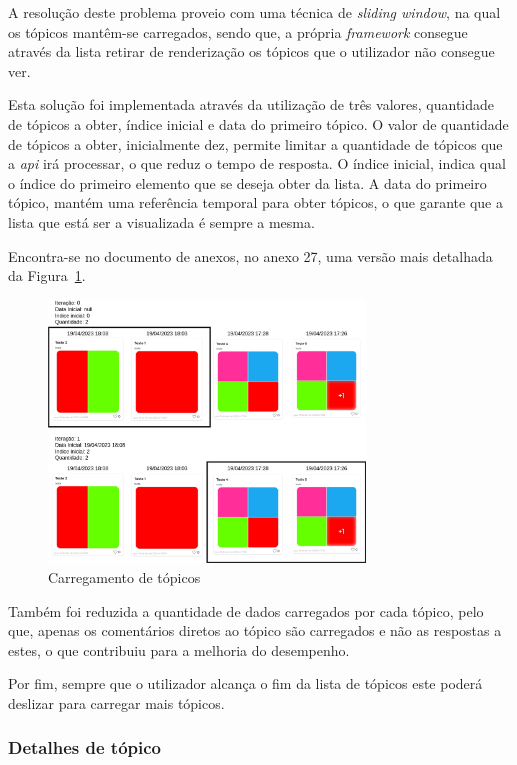 A resolução deste problema proveio com uma técnica de \textit{sliding window}, na qual os tópicos mantêm-se carregados, sendo que, a própria \textit{framework} consegue através da lista retirar de renderização os tópicos que o utilizador não consegue ver. 

Esta solução foi implementada através da utilização de três valores, quantidade de tópicos a obter, índice inicial e data do primeiro tópico. O valor de quantidade de tópicos a obter, inicialmente dez, permite limitar a quantidade de tópicos que a \textit{\acrshort{api}} irá processar, o que reduz o tempo de resposta. O índice inicial, indica qual o índice do primeiro elemento que se deseja obter da lista. A data do primeiro tópico, mantém uma referência temporal para obter tópicos, o que garante que a lista que está ser a visualizada é sempre a mesma.

Encontra-se no documento de anexos, no anexo 27, uma versão mais detalhada da Figura~\ref*{fig:74}.

\begin{figure}[htb]
 \centering
 \includegraphics[width=0.75\textwidth]{images/implementacao/frontend/forum/loading_topics/topics_loading.png}
 \caption{Carregamento de tópicos}
 \label{fig:74}
\end{figure}
Também foi reduzida a quantidade de dados carregados por cada tópico, pelo que, apenas os comentários diretos ao tópico são carregados e não as respostas a estes, o que contribuiu para a melhoria do desempenho.

Por fim, sempre que o utilizador alcança o fim da lista de tópicos este poderá deslizar para carregar mais tópicos.

\newpage

\subsubsection{Detalhes de tópico}

